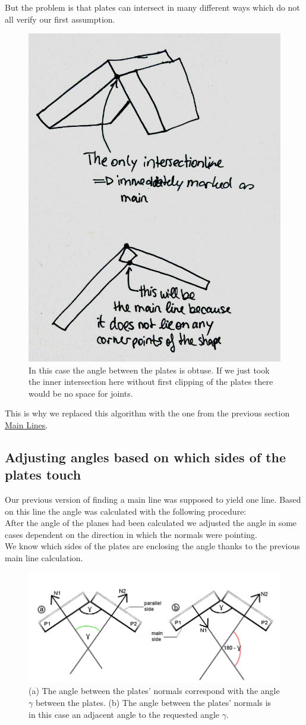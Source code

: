 \documentclass[../ClassicThesis.tex]{subfiles}
\begin{document}
But the problem is that plates can intersect in many different ways which do not all verify our first assumption. 
\begin{figure}[!ht]
\centering
\includegraphics[width=.5\columnwidth]{Images/06-1-graph-assumptionMainLine.jpg}
\caption{In this case the angle between the plates is obtuse. If we just took the inner intersection here without first clipping of the plates there would be no space for joints. }
\end{figure}
This is why we replaced this algorithm with the one from the previous section \hyperref[mainLine]{Main Lines}.

\subsection{Adjusting angles based on which sides of the plates touch}
Our previous version of finding a main line was supposed to yield one line. Based on this line the angle was calculated with the following procedure:\\ 
After the angle of the planes had been calculated we adjusted the angle in some cases dependent on the direction in which the normals were pointing. \\
We know which sides of the plates are enclosing the angle thanks to the previous main line calculation.
\begin{figure}[!ht]
\centering
\includegraphics[width= 1\columnwidth]{Images/anglesExamplesSmall.png}
\caption{(a) The angle between the plates' normals correspond with the angle $\gamma$ between the plates. (b) The angle between the plates' normals is in this case an adjacent angle to the requested angle $\gamma$.}
\end{figure}
\end{document}

